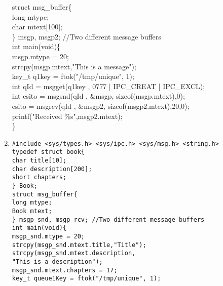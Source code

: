 \begin{flushleft}
\begin{flushleft}
\begin{enumerate}
{            struct msg\_buffer\{ \\
            \halftab long mtype; \\
            \halftab char mtext[100]; \\
            \} msgp, msgp2; //Two different message buffers\\
            int main(void)\{\\
            \halftab msgp.mtype = 20;\\
            \halftab strcpy(msgp.mtext,"This is a message");\\
            \halftab key\_t q1key = ftok("/tmp/unique", 1);\\
            \halftab int qId = msgget(q1key , 0777 | IPC\_CREAT | IPC\_EXCL);\\
            \halftab int esito = msgsnd(qId , \&msgp, sizeof(msgp.mtext),0);\\
            \halftab esito = msgrcv(qId , \&msgp2, sizeof(msgp2.mtext),20,0);\\
            \halftab printf("Received \%s\n",msgp2.mtext);\\
            \}}
      \item \texttt{\#include <sys/types.h> <sys/ipc.h> <sys/msg.h> <string.h>\\
            typedef struct book\{\\
            \halftab char title[10]; \\
            \halftab char description[200]; \\
            \halftab short chapters;\\
            \} Book;\\
            struct msg\_buffer\{ \\ 
            \halftab long mtype; \\
            \halftab Book mtext; \\
            \} msgp\_snd, msgp\_rcv; //Two different message buffers \\
            int main(void)\{\\
            \halftab msgp\_snd.mtype = 20;\\
            \halftab strcpy(msgp\_snd.mtext.title,"Title");\\
            \halftab strcpy(msgp\_snd.mtext.description,\\ \tab \tab "This is a description");\\
            \halftab msgp\_snd.mtext.chapters = 17;\\
            \halftab key\_t queue1Key = ftok("/tmp/unique", 1);\\
}
\end{enumerate}
\end{flushleft}
\end{flushleft}

